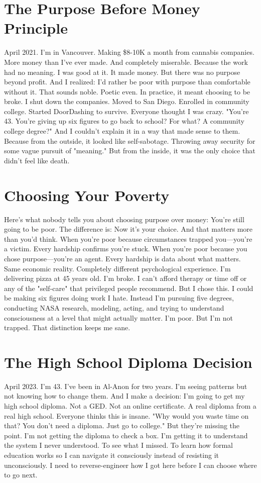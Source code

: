 \documentclass[12pt,openany]{book}
\begin{document}
\section{The Purpose Before Money Principle}

April 2021. I'm in Vancouver. Making \$8-10K a month from cannabis companies. More money than I've ever made. And completely miserable.
Because the work had no meaning. I was good at it. It made money. But there was no purpose beyond profit.
And I realized: I'd rather be poor with purpose than comfortable without it.
That sounds noble. Poetic even.
In practice, it meant choosing to be broke.
I shut down the companies. Moved to San Diego. Enrolled in community college. Started DoorDashing to survive.
Everyone thought I was crazy.
"You're 43. You're giving up six figures to go back to school? For what? A community college degree?"
And I couldn't explain it in a way that made sense to them.
Because from the outside, it looked like self-sabotage. Throwing away security for some vague pursuit of "meaning."
But from the inside, it was the only choice that didn't feel like death.

\section{Choosing Your Poverty}

Here's what nobody tells you about choosing purpose over money:
You're still going to be poor. The difference is: Now it's your choice.
And that matters more than you'd think.
When you're poor because circumstances trapped you—you're a victim. Every hardship confirms you're stuck.
When you're poor because you chose purpose—you're an agent. Every hardship is data about what matters.
Same economic reality. Completely different psychological experience.
I'm delivering pizza at 45 years old. I'm broke. I can't afford therapy or time off or any of the "self-care" that privileged people recommend.
But I chose this.
I could be making six figures doing work I hate. Instead I'm pursuing five degrees, conducting NASA research, modeling, acting, and trying to understand consciousness at a level that might actually matter.
I'm poor. But I'm not trapped.
That distinction keeps me sane.

\section{The High School Diploma Decision}

April 2023. I'm 43. I've been in Al-Anon for two years. I'm seeing patterns but not knowing how to change them.
And I make a decision:
I'm going to get my high school diploma.
Not a GED. Not an online certificate. A real diploma from a real high school.
Everyone thinks this is insane.
"Why would you waste time on that? You don't need a diploma. Just go to college."
But they're missing the point.
I'm not getting the diploma to check a box. I'm getting it to understand the system I never understood. To see what I missed. To learn how formal education works so I can navigate it consciously instead of resisting it unconsciously.
I need to reverse-engineer how I got here before I can choose where to go next.
\end{document}
